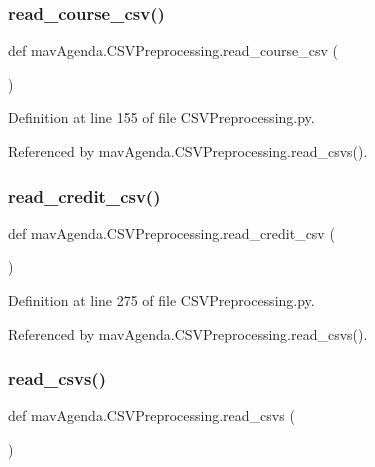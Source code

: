 \subsubsection{\texorpdfstring{read\+\_\+course\+\_\+csv()}{read\_course\_csv()}}
{\footnotesize\ttfamily def mav\+Agenda.\+C\+S\+V\+Preprocessing.\+read\+\_\+course\+\_\+csv (\begin{DoxyParamCaption}{ }\end{DoxyParamCaption})}



Definition at line 155 of file C\+S\+V\+Preprocessing.\+py.



Referenced by mav\+Agenda.\+C\+S\+V\+Preprocessing.\+read\+\_\+csvs().

\mbox{\label{namespacemavAgenda_1_1CSVPreprocessing_a9653d802c569f94888256343d5f8bfd1}} 
\subsubsection{\texorpdfstring{read\+\_\+credit\+\_\+csv()}{read\_credit\_csv()}}
{\footnotesize\ttfamily def mav\+Agenda.\+C\+S\+V\+Preprocessing.\+read\+\_\+credit\+\_\+csv (\begin{DoxyParamCaption}{ }\end{DoxyParamCaption})}



Definition at line 275 of file C\+S\+V\+Preprocessing.\+py.



Referenced by mav\+Agenda.\+C\+S\+V\+Preprocessing.\+read\+\_\+csvs().

\mbox{\label{namespacemavAgenda_1_1CSVPreprocessing_a0092c9e65194decbabf6bb32584c7d45}} 
\subsubsection{\texorpdfstring{read\+\_\+csvs()}{read\_csvs()}}
{\footnotesize\ttfamily def mav\+Agenda.\+C\+S\+V\+Preprocessing.\+read\+\_\+csvs (\begin{DoxyParamCaption}{ }\end{DoxyParamCaption})}



